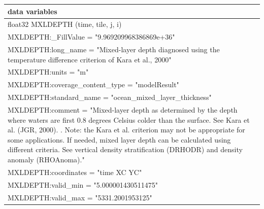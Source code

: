\begin{longtable}{|p{\textwidth}|}
data variables\\
\hline
\hspace{0.5cm}float32 MXLDEPTH (time, tile, j, i)\\
\hspace{0.5cm}\hspace{0.5cm}MXLDEPTH:\_FillValue = "9.969209968386869e+36"\\
\hspace{0.5cm}\hspace{0.5cm}MXLDEPTH:long\_name = "Mixed-layer depth diagnosed using the temperature difference criterion of Kara et al., 2000"\\
\hspace{0.5cm}\hspace{0.5cm}MXLDEPTH:units = "m"\\
\hspace{0.5cm}\hspace{0.5cm}MXLDEPTH:coverage\_content\_type = "modelResult"\\
\hspace{0.5cm}\hspace{0.5cm}MXLDEPTH:standard\_name = "ocean\_mixed\_layer\_thickness"\\
\hspace{0.5cm}\hspace{0.5cm}MXLDEPTH:comment = "Mixed-layer depth as determined by the depth where waters are first 0.8 degrees Celsius colder than the surface. See Kara et al. (JGR, 2000). . Note: the Kara et al. criterion may not be appropriate for some applications. If needed, mixed layer depth can be calculated using different criteria. See vertical density stratification (DRHODR) and density anomaly (RHOAnoma)."\\
\hspace{0.5cm}\hspace{0.5cm}MXLDEPTH:coordinates = "time XC YC"\\
\hspace{0.5cm}\hspace{0.5cm}MXLDEPTH:valid\_min = "5.000001430511475"\\
\hspace{0.5cm}\hspace{0.5cm}MXLDEPTH:valid\_max = "5331.2001953125"\\
\hline
\end{longtable}